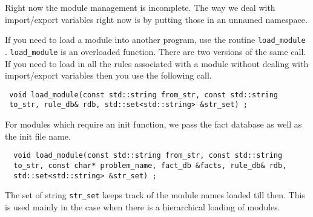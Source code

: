 %
Right now the module management is incomplete. The way we deal with
import/export variables right now is by putting those in an unnamed
namespace.  

If you need to load a module into  another program, use the routine
{\tt load\_module} . {\tt load\_module} is an overloaded
function. There are two versions of the same call. If you need to load 
in all the rules associated with a module without dealing with
import/export variables then you use the following call. 

\begin{verbatim}
 void load_module(const std::string from_str, const std::string
 to_str, rule_db& rdb, std::set<std::string> &str_set) ;
\end{verbatim}

For modules which require an init function, we pass the fact database
as well as the init file name. 
\begin{verbatim}
  void load_module(const std::string from_str, const std::string
  to_str, const char* problem_name, fact_db &facts, rule_db& rdb,
  std::set<std::string> &str_set) ;
\end{verbatim}

The set of string {\tt str\_set} keeps track of the module names
loaded till then. This is used mainly in the case when there is a
hierarchical loading of modules.  

